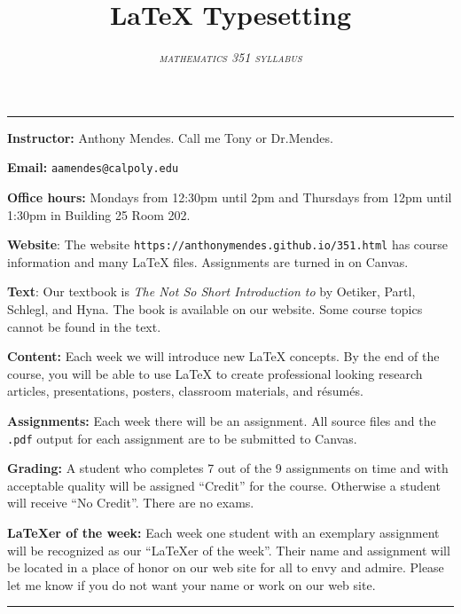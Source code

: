 \documentclass[10pt]{article}
\title{\LaTeX{} Typesetting}
\author{\textsc{\textit{mathematics 351 syllabus}}}
\date{}
\begin{document}
\maketitle

\thispagestyle{empty}

\begin{center}
  \rule{10eM}{1pt}
\end{center}

\textbf{Instructor:} Anthony Mendes.  Call me Tony or
Dr.\@ Mendes.

\textbf{Email:} \texttt{aamendes@calpoly.edu}

\textbf{Office hours:} Mondays from 12:30pm until 2pm
and Thursdays from 12pm until 1:30pm in Building 25
Room 202.

\textbf{Website}: The website
\texttt{https://anthonymendes.github.io/351.html} has
course information and many \LaTeX{} files.
Assignments are turned in on Canvas.

\textbf{Text}: Our textbook is \textsl{The Not So
  Short Introduction to \LaTeXe} by Oetiker, Partl,
Schlegl, and Hyna.  The book is available on our
website.  Some course topics cannot be found in the
text.

\textbf{Content:} Each week we will introduce new
\LaTeX{} concepts.  By the end of the course, you will
be able to use \LaTeX{} to create professional looking
research articles, presentations, posters, classroom
materials, and r\'esum\'es.

\textbf{Assignments:} Each week there will be an
assignment.  All source files and the \texttt{.pdf}
output for each assignment are to be submitted to
Canvas.

\textbf{Grading:} A student who completes 7 out of the
9 assignments on time and with acceptable quality will
be assigned ``Credit'' for the course.  Otherwise a
student will receive ``No Credit''.  There are no
exams.

\textbf{\LaTeX{er} of the week:} Each week one student
with an exemplary assignment will be recognized as our
``\LaTeX{er} of the week''.  Their name and assignment
will be located in a place of honor on our web site
for all to envy and admire.  Please let me know if you
do not want your name or work on our web site.

\rule{\textwidth}{.02ex}
\end{document}
